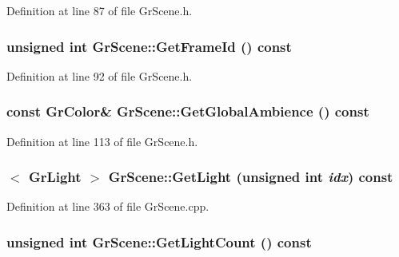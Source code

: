 Definition at line 87 of file GrScene.h.\hypertarget{class_gr_scene_fbe441d52737edbdf48e2f0925129ace}{
\subsubsection[{GetFrameId}]{\setlength{\rightskip}{0pt plus 5cm}unsigned int GrScene::GetFrameId () const}}
\label{class_gr_scene_fbe441d52737edbdf48e2f0925129ace}




Definition at line 92 of file GrScene.h.\hypertarget{class_gr_scene_59c6545b88059447aac8f9ca4d1c3bf2}{
\subsubsection[{GetGlobalAmbience}]{\setlength{\rightskip}{0pt plus 5cm}const {\bf GrColor}\& GrScene::GetGlobalAmbience () const}}
\label{class_gr_scene_59c6545b88059447aac8f9ca4d1c3bf2}




Definition at line 113 of file GrScene.h.\hypertarget{class_gr_scene_afe37dfc9c622a8e711da54913de9f82}{
\subsubsection[{GetLight}]{$<$ {\bf GrLight} $>$ GrScene::GetLight (unsigned int {\em idx}) const}}
\label{class_gr_scene_afe37dfc9c622a8e711da54913de9f82}




Definition at line 363 of file GrScene.cpp.\hypertarget{class_gr_scene_0aecbaefcc7f4c2e7f03f9103df539ea}{
\subsubsection[{GetLightCount}]{\setlength{\rightskip}{0pt plus 5cm}unsigned int GrScene::GetLightCount () const}}
\label{class_gr_scene_0aecbaefcc7f4c2e7f03f9103df539ea}




